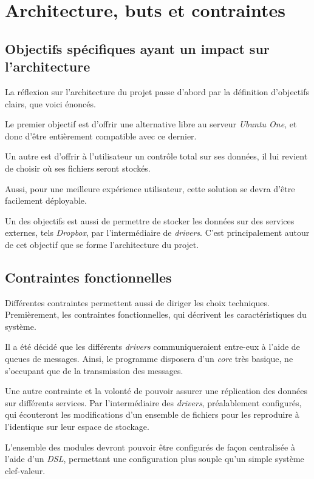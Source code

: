 \chapter{Architecture, buts et contraintes}
\thispagestyle{EIP} %

\section{Objectifs spécifiques ayant un impact sur l'architecture}

La réflexion sur l'architecture du projet passe d'abord par la
définition d'objectifs clairs, que voici énoncés.

Le premier objectif est d'offrir une alternative libre au serveur
\emph{Ubuntu One}, et donc d'être entièrement compatible avec ce
dernier.

Un autre est d'offrir à l'utilisateur un contrôle total sur ses données,
il lui revient de choisir où ses fichiers seront stockés.

Aussi, pour une meilleure expérience utilisateur, cette solution se
devra d'être facilement déployable.

Un des objectifs est aussi de permettre de stocker les données sur des
services externes, tels \emph{Dropbox}, par l'intermédiaire de
\emph{drivers}. C'est principalement autour de cet objectif que se forme
l'architecture du projet.

\section{Contraintes fonctionnelles}

Différentes contraintes permettent aussi de diriger les choix
techniques. Premièrement, les contraintes fonctionnelles, qui décrivent
les caractéristiques du système.

Il a été décidé que les différents \emph{drivers} communiqueraient
entre-eux à l'aide de queues de messages. Ainsi, le programme disposera
d'un \emph{core} très basique, ne s'occupant que de la transmission des
messages.

Une autre contrainte et la volonté de pouvoir assurer une réplication
des données sur différents services. Par l'intermédiaire des
\emph{drivers}, préalablement configurés, qui écouteront les
modifications d'un ensemble de fichiers pour les reproduire à
l'identique sur leur espace de stockage.

L'ensemble des modules devront pouvoir être configurés de façon
centralisée à l'aide d'un \emph{DSL}, permettant une configuration plus
souple qu'un simple système clef-valeur.

